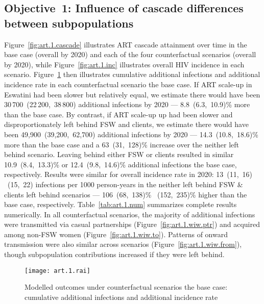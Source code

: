 \subsection{Objective~1: Influence of cascade differences between subpopulations}\label{art.res.1}
Figure~\ref{fig:art.1.cascade} illustrates ART cascade attainment over time
in the base case (\cashi overall by 2020) and
each of the four counterfactual scenarios (\casmd overall by 2020), while
Figure~\ref{fig:art.1.inc} illustrates overall HIV incidence in each scenario.
Figure~\ref{fig:art.1.rai} then illustrates
cumulative additional infections and additional incidence rate
in each counterfactual scenario \vs the base case.
If ART scale-up in Eswatini had been slower but relatively equal,
we estimate there would have been
30\,700~(22\,200,~38\,800) additional infections by 2020 ---
8.8~(6.3,~10.9)\% more than the base case. %
By contrast, if ART scale-up up had been slower and
disproportionately left behind FSW and clients,
we estimate there would have been
49,900~(39,200,~62,700) additional infections by 2020 ---
14.3~(10.8,~18.6)\% more than the base case %
and a 63~(31,~128)\% increase over the neither left behind scenario. %
Leaving behind either FSW or clients resulted in similar
10.9~(8.4,~13.3)\% or 12.4~(9.8,~14.6)\% additional infections
\vs the base case, respectively. %
Results were similar for overall incidence rate in 2020:
13~(11,~16) ~(15,~22) infections per 1000 person-years
in the neither left behind \vs FSW \& clients left behind scenarios ---
106~(68,~138)\% ~(152,~235)\% higher than the base case, respectively.
Table~\ref{tab:art.1.num} summarizes complete results numerically.
In all counterfactual scenarios, the majority of additional infections were
transmitted via casual partnerships (Figure~\ref{fig:art.1.wiw.ptr}) %
and acquired among non-FSW women (Figure~\ref{fig:art.1.wiw.to}). %
Patterns of onward transmission were also similar across scenarios %
(Figure~\ref{fig:art.1.wiw.from}),
though subpopulation contributions increased if they were left behind.
\begin{figure}[h]
  \centering\texttt{[image: art.1.rai]}
  \caption{Modelled outcomes under counterfactual scenarios \vs the base case:
    cumulative additional infections and additional incidence rate}
  \label{fig:art.1.rai}
\end{figure}
